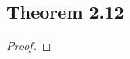 \documentclass[../../main.tex]{subfiles}
\begin{document}
\subsection{Theorem 2.12}
\begin{wts}

\end{wts}
\begin{proof}

\end{proof}
\end{document}
